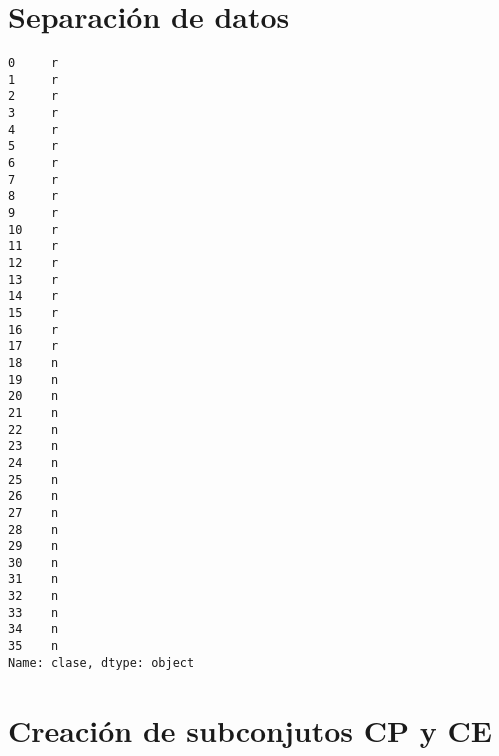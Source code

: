 \section{Separación de datos}


\begin{Shaded}
\begin{Highlighting}[]
\OperatorTok{=}\NormalTok{ datos.iloc[:,:}\OperatorTok{{-}}\NormalTok{]}
\OperatorTok{=}\NormalTok{ datos.iloc[:,}\NormalTok{]}
\end{Highlighting}
\end{Shaded}

\begin{Shaded}
\begin{Highlighting}[]
\end{Highlighting}
\end{Shaded}

\begin{verbatim}
0     r
1     r
2     r
3     r
4     r
5     r
6     r
7     r
8     r
9     r
10    r
11    r
12    r
13    r
14    r
15    r
16    r
17    r
18    n
19    n
20    n
21    n
22    n
23    n
24    n
25    n
26    n
27    n
28    n
29    n
30    n
31    n
32    n
33    n
34    n
35    n
Name: clase, dtype: object
\end{verbatim}

\section{Creación de subconjutos CP y CE}


\begin{Shaded}
\begin{Highlighting}[]
\end{Highlighting}
\end{Shaded}


\begin{Shaded}
\begin{Highlighting}[]
\OperatorTok{=}\OperatorTok{=}\OperatorTok{=}\NormalTok{)}
\end{Highlighting}
\end{Shaded}


\begin{Shaded}
\begin{Highlighting}[]
\end{Highlighting}
\end{Shaded}


